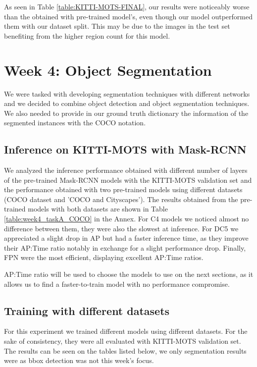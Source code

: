 \documentclass[11pt,a4paper,twocolumn,twoside]{article}
\begin{document}
As seen in Table \ref{table:KITTI-MOTS-FINAL}, our results were noticeably worse than the obtained with pre-trained model's, even though our model outperformed them with our dataset split. This may be due to the images in the test set benefiting from the higher region count for this model.

\section{Week 4: Object Segmentation}

We were tasked with developing segmentation techniques with different networks and we decided to combine object detection and object segmentation techniques.
We also needed to provide in our ground truth dictionary the information of the segmented instances with the COCO notation.

\subsection{Inference on KITTI-MOTS with Mask-RCNN}

We analyzed the inference performance obtained with different number of layers of the pre-trained Mask-RCNN models with the KITTI-MOTS validation set and the performance obtained with two pre-trained models using different datasets (COCO dataset and 'COCO and Cityscapes'). The results obtained from the pre-trained models with both datasets are shown in Table \ref{table:week4_taskA_COCO} in the Annex. For C4 models we noticed almost no difference between them, they were also the slowest at inference. For DC5 we appreciated a slight drop in AP but had a faster inference time, as they improve their AP:Time ratio notably in exchange for a slight performance drop. Finally, FPN were the most efficient, displaying excellent AP:Time ratios.

AP:Time ratio will be used to choose the models to use on the next sections, as it allows us to find a faster-to-train model with no performance compromise.


\subsection{Training with different datasets}
For this experiment we trained different models using different datasets. For the sake of consistency, they were all evaluated with KITTI-MOTS validation set. The results can be seen on the tables listed below, we only segmentation results were as bbox detection was not this week's focus.
\end{document}
